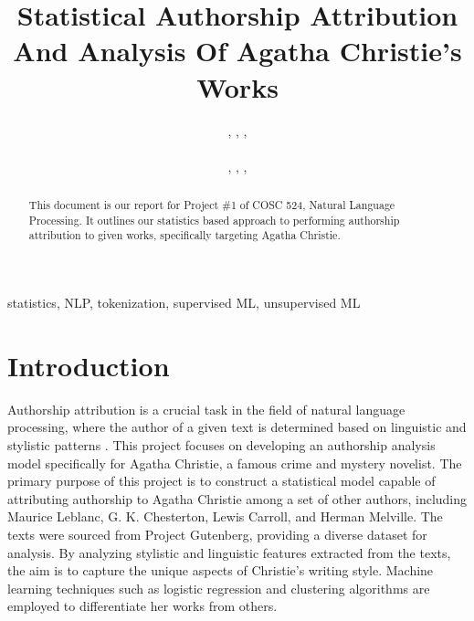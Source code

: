 \documentclass[journal]{IEEEtran} %
\begin{document}
\title{Statistical Authorship Attribution And Analysis Of Agatha
Christie’s Works
}

\author{%
    , 
    , 
    , 
    \\%
    \\%
    , 
    , 
    , 
}

\maketitle

\begin{abstract}
    This document is our report for Project \#1 of COSC 524, Natural Language Processing. It outlines our statistics based approach to performing authorship attribution to given works, specifically targeting Agatha Christie.
\end{abstract}

\begin{IEEEkeywords}
    statistics, NLP, tokenization, supervised ML, unsupervised ML
\end{IEEEkeywords}

\section{Introduction}
Authorship attribution is a crucial task in the field of natural language processing, where the author of a given text is determined based on linguistic and stylistic patterns \cite{misini2022}. This project focuses on developing an authorship analysis model specifically for Agatha Christie, a famous crime and mystery novelist. The primary purpose of this project is to construct a statistical model capable of attributing authorship to Agatha Christie among a set of other authors, including  Maurice Leblanc, G. K. Chesterton, Lewis Carroll, and Herman Melville. The texts were sourced from Project Gutenberg, providing a diverse dataset for analysis. By analyzing stylistic and linguistic features extracted from the texts, the aim is to capture the unique aspects of Christie's writing style. Machine learning techniques such as logistic regression and clustering algorithms are employed to differentiate her works from others.
\end{document}
